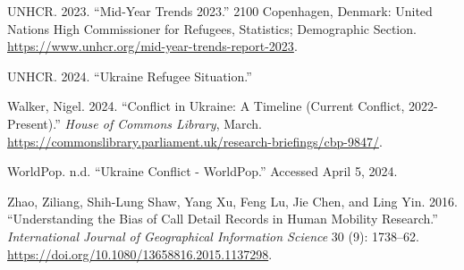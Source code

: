 \documentclass[
  sn-nature,
  11pt,
]{sn-jnl}
\newlength{\cslhangindent}
\newenvironment{CSLReferences}[2] %
 {\begin{list}{}{%
  \setlength{\itemindent}{0pt}
  \setlength{\leftmargin}{0pt}
  \setlength{\parsep}{0pt}
  \ifodd #1
   \setlength{\leftmargin}{\cslhangindent}
   \setlength{\itemindent}{-1\cslhangindent}
  \fi
  \setlength{\itemsep}{#2\baselineskip}}}
 {\end{list}}
\begin{document}
\begin{CSLReferences}{1}{0}
UNHCR. 2023. {``Mid-Year Trends 2023.''} 2100 Copenhagen, Denmark:
United Nations High Commissioner for Refugees, Statistics; Demographic
Section. \url{https://www.unhcr.org/mid-year-trends-report-2023}.

UNHCR. 2024. {``Ukraine Refugee Situation.''}

Walker, Nigel. 2024. {``Conflict in {Ukraine: A} Timeline (Current
Conflict, 2022-Present).''} \emph{{House of Commons Library}}, March.
\url{https://commonslibrary.parliament.uk/research-briefings/cbp-9847/}.

WorldPop. n.d. {``Ukraine Conflict - {WorldPop}.''} Accessed April 5,
2024.

Zhao, Ziliang, Shih-Lung Shaw, Yang Xu, Feng Lu, Jie Chen, and Ling Yin.
2016. {``Understanding the Bias of Call Detail Records in Human Mobility
Research.''} \emph{International Journal of Geographical Information
Science} 30 (9): 1738--62.
\url{https://doi.org/10.1080/13658816.2015.1137298}.

\end{CSLReferences}
\end{document}
